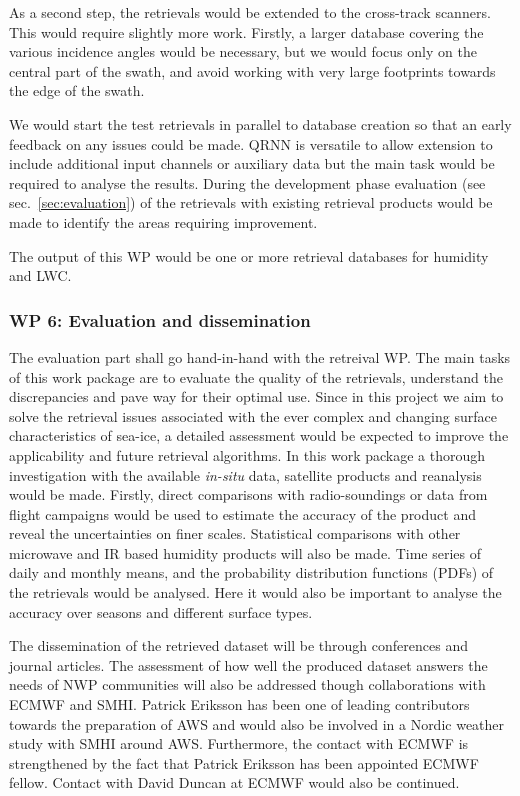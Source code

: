 \documentclass[12pt,oneside,a4paper]{article}
\begin{document}
As a second step, the retrievals would be extended to the cross-track scanners. This would require slightly more work. Firstly, a larger database covering the various incidence angles would be necessary, but we would focus only on the central part of the swath, and avoid working with very large footprints towards the edge of the swath. 


We would start the test retrievals in parallel to database creation so that an early feedback on any issues could be made. QRNN is versatile to allow extension to include additional input channels or auxiliary data but the main task would be required to analyse the results. During the development phase evaluation (see sec.~\ref{sec:evaluation}) of the retrievals with existing retrieval products would be made to identify the areas requiring improvement.

The output of this WP would be one or more retrieval databases for humidity and LWC.

\subsubsection*{WP 6: Evaluation and dissemination}
%
\label{sec:evaluation}
The evaluation part shall go hand-in-hand with the retreival WP. The main tasks of this work package are to evaluate the quality of the retrievals, understand the discrepancies and pave way for their optimal use. Since in this project we aim to solve the retrieval issues associated with the ever complex and changing surface characteristics of sea-ice, a detailed assessment would be expected to improve the applicability and future retrieval algorithms. In this work package a thorough investigation with the available \textit{in-situ} data, satellite products and reanalysis would be made. Firstly, direct comparisons with radio-soundings or data from flight campaigns would be used to estimate the accuracy of the product and reveal the uncertainties on finer scales.  Statistical comparisons with other microwave and IR based humidity products  will also be made. Time series of daily and monthly means, and the probability distribution functions (PDFs) of the retrievals would be analysed. Here it would also be important to analyse the accuracy over seasons and different surface types. 

The dissemination of the retrieved dataset will be through conferences and journal articles. The assessment of how well the produced dataset answers the needs of NWP communities will also be addressed though collaborations with ECMWF and SMHI. Patrick Eriksson has been one of leading contributors towards the preparation of AWS and would also be involved in a Nordic weather study with SMHI around AWS. Furthermore, the contact with ECMWF is strengthened by the fact that Patrick Eriksson has been appointed ECMWF fellow. Contact with David Duncan at ECMWF would also be continued. 
\end{document}
